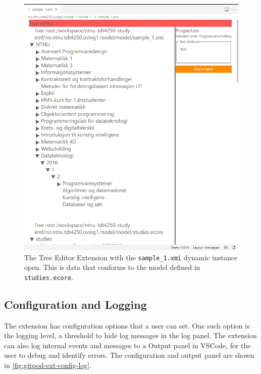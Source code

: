 \begin{figure}[H]  %
  \centering
  \includegraphics[width=\textwidth]{figures/gitpod-vscode-xmi-study-instance.png}
  \caption[Tree Editor Extension showing a dynamic instance]{The Tree Editor Extension with the \texttt{sample_1.xmi} dynamic instance open. This is data that conforms to the model defined in \texttt{studies.ecore}.}\label{fig:gitpod-ext-dynamic}
\end{figure}


\subsection{Configuration and Logging}

The extension has configuration options that a user can set.
One such option is the logging level, a threshold to hide log messages in the log panel.
The extension can also log internal events and messages to a Output panel in \gls{VSCode}, for the user to debug and identify errors.
The configuration and output panel are shown in \cref{fig:gitpod-ext-config-log}.

